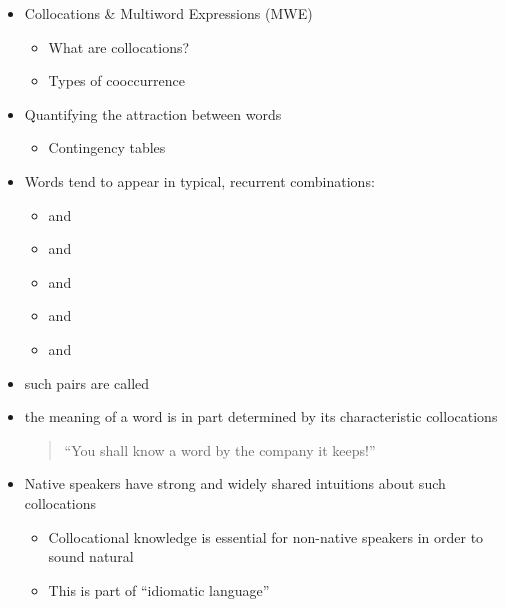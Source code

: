 \documentclass[a4paper,landscape,headrule,footrule,dvips]{foils}
\begin{document}
\begin{CJK}{UTF8}{min}



\begin{itemize}
\item Collocations \& Multiword Expressions (MWE)
\begin{itemize}
\item What are collocations?
\item Types of cooccurrence
\end{itemize}
\item Quantifying the attraction between words
\begin{itemize}
\item Contingency tables
\end{itemize}
\end{itemize}


\begin{itemize}
\item Words tend to appear in typical, recurrent combinations:
\begin{itemize}
\item {} and 
\item {} and 
\item {} and 
\item {} and 
\item {} and 
\end{itemize}
\item such pairs are called  \citep{Firth:1957}
\item the meaning of a word is in part determined by its
characteristic collocations
\begin{quote}
``You shall know a word by the company it keeps!''
\end{quote}
\end{itemize}


\begin{itemize}
\item Native speakers have strong and widely shared intuitions
about such collocations
\begin{itemize}
\item Collocational knowledge is essential for non-native
speakers in order to sound natural
\item This is part of ``idiomatic language''
\end{itemize}
\end{itemize}


\end{CJK}
\end{document}
